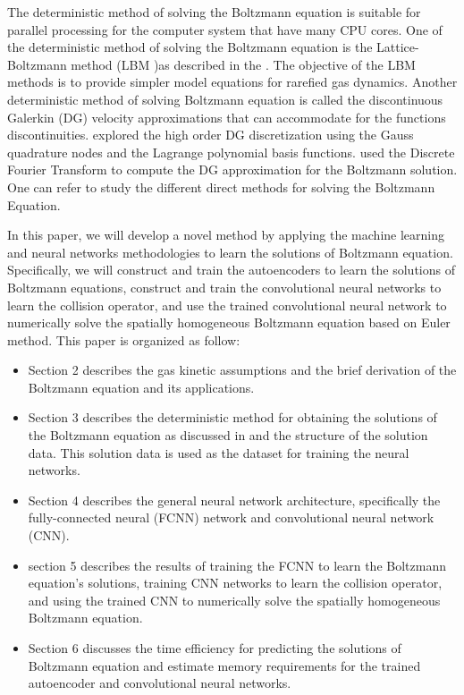 \documentclass{article}
\begin{document}
The deterministic method of solving the Boltzmann equation is suitable for parallel processing for the computer system that have many CPU cores. One of the deterministic method of solving the Boltzmann equation is the Lattice-Boltzmann method (LBM )as described in the \cite{LBM1, LBM2}. The objective of the LBM methods is to provide simpler model equations for rarefied gas dynamics. Another deterministic method of solving Boltzmann equation is called the discontinuous Galerkin (DG) velocity approximations that can accommodate for the functions discontinuities. \cite{Alekseenko1, Alekseenko2} explored the high order DG discretization using the Gauss quadrature nodes and the Lagrange polynomial basis functions. \cite{Alekseenko4} used the Discrete Fourier Transform to compute the DG approximation for the Boltzmann solution. One can refer \cite{VVAristo} to study the different direct methods for solving the Boltzmann Equation.

In this paper, we will develop a novel method by applying the machine learning and neural networks methodologies to learn the solutions of Boltzmann equation. Specifically, we will construct and train the autoencoders to learn the solutions of Boltzmann equations, construct and train the convolutional neural networks to learn the collision operator, and use the trained convolutional neural network to numerically solve the spatially homogeneous Boltzmann equation based on Euler method. This paper is organized as follow:
\begin{itemize}
	\item Section 2 describes the gas kinetic assumptions and the brief derivation of the Boltzmann equation and its applications.
	\item Section 3 describes the deterministic method for obtaining the solutions of the Boltzmann equation as discussed in \cite{Alekseenko2, Alekseenko4} and the structure of the solution data. This solution data is used as the dataset for training the neural networks.
	\item Section 4 describes the general neural network architecture, specifically the fully-connected neural (FCNN) network and convolutional neural network (CNN).
	\item section 5 describes the results of training the FCNN to learn the Boltzmann equation's solutions, training CNN networks to learn the collision operator,  and using the trained CNN to numerically solve the spatially homogeneous Boltzmann equation.
	\item Section 6 discusses the time efficiency for predicting the solutions of Boltzmann equation and estimate memory requirements for the trained autoencoder and convolutional neural networks.
\end{itemize}
\end{document}
